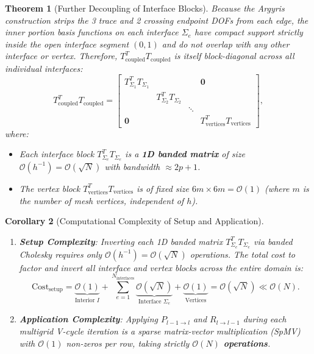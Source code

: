 \documentclass[11pt,a4paper]{article}
\newtheorem{theorem}{Theorem}[section]
\newtheorem{corollary}[theorem]{Corollary}
\newcommand{\mb}[1]{\mathbf{#1}}
\begin{document}
\begin{theorem}[Further Decoupling of Interface Blocks]
Because the Argyris construction strips the 3 trace and 2 crossing endpoint DOFs from each edge, the inner portion basis functions on each interface $\Sigma_e$ have compact support strictly inside the open interface segment $(0,1)$ and do not overlap with any other interface or vertex.
Therefore, $T_{\text{coupled}}^T T_{\text{coupled}}$ is itself block-diagonal across all individual interfaces:
\begin{equation}
    T_{\text{coupled}}^T T_{\text{coupled}} = \begin{bmatrix}
        T_{\Sigma_1}^T T_{\Sigma_1} & & & \mb{0} \\
        & T_{\Sigma_2}^T T_{\Sigma_2} & & \\
        & & \ddots & \\
        \mb{0} & & & T_{\text{vertices}}^T T_{\text{vertices}}
    \end{bmatrix},
\end{equation}
where:
\begin{itemize}
    \item Each interface block $T_{\Sigma_e}^T T_{\Sigma_e}$ is a \textbf{1D banded matrix} of size $\mathcal{O}(h^{-1}) = \mathcal{O}(\sqrt{N})$ with bandwidth $\approx 2p+1$.
    \item The vertex block $T_{\text{vertices}}^T T_{\text{vertices}}$ is of fixed size $6m \times 6m = \mathcal{O}(1)$ (where $m$ is the number of mesh vertices, independent of $h$).
\end{itemize}
\end{theorem}

\begin{corollary}[Computational Complexity of Setup and Application]
\begin{enumerate}
    \item \textbf{Setup Complexity}: Inverting each 1D banded matrix $T_{\Sigma_e}^T T_{\Sigma_e}$ via banded Cholesky requires only $\mathcal{O}(h^{-1}) = \mathcal{O}(\sqrt{N})$ operations. The total cost to factor and invert all interface and vertex blocks across the entire domain is:
    \begin{equation}
        \text{Cost}_{\text{setup}} = \underbrace{\mathcal{O}(1)}_{\text{Interior } I} + \sum_{e=1}^{N_{\text{interfaces}}} \underbrace{\mathcal{O}(\sqrt{N})}_{\text{Interface } \Sigma_e} + \underbrace{\mathcal{O}(1)}_{\text{Vertices}} = \mathcal{O}(\sqrt{N}) \ll \mathcal{O}(N).
    \end{equation}
    \item \textbf{Application Complexity}: Applying $P_{l-1 \to l}$ and $R_{l \to l-1}$ during each multigrid V-cycle iteration is a sparse matrix-vector multiplication (SpMV) with $\mathcal{O}(1)$ non-zeros per row, taking strictly \textbf{$\mathcal{O}(N)$ operations}.
\end{enumerate}
\end{corollary}
\end{document}
